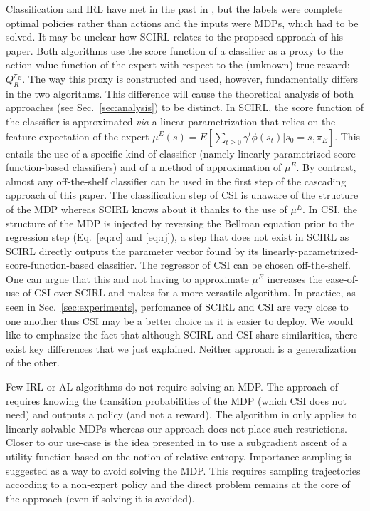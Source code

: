 \documentclass[smallextended]{svjour3}
\begin{document}
Classification and IRL have met in the past in \cite{ratliff2006maximum}, but the labels were complete optimal policies rather than actions and the inputs were MDPs, which had to be solved. It may be unclear how SCIRL \cite{klein2012scirl} relates to the proposed approach of his paper. Both algorithms use the score function of a classifier as a proxy to the action-value function of the expert with respect to the (unknown) true reward: $Q^{\pi_E}_R$. The way this proxy is constructed and used, however, fundamentally differs in the two algorithms. This difference will cause the theoretical analysis of both approaches (see Sec.~\ref{sec:analysis}) to be distinct. In SCIRL, the score function of the classifier is approximated {\it via} a linear parametrization that relies on the feature expectation of the expert $\mu^E(s) = E[\sum_{t\geq 0}\gamma^t\phi(s_t)|s_0=s,\pi_E]$. This entails the use of a specific kind of classifier (namely linearly-parametrized-score-function-based classifiers) and of a method of approximation of $\mu^E$. By contrast, almost any off-the-shelf classifier can be used in the first step of the cascading approach of this paper. The classification step of CSI is unaware of the structure of the MDP whereas SCIRL knows about it thanks to the use of $\mu^E$. In CSI, the structure of the MDP is injected by reversing the Bellman equation prior to the regression step (Eq.~\ref{eq:rc} and \eqref{eq:rj}), a step that does not exist in SCIRL as SCIRL directly outputs the parameter vector found by its linearly-parametrized-score-function-based classifier. The regressor of CSI can be chosen off-the-shelf. One can argue that this and not having to approximate $\mu^E$ increases the ease-of-use of CSI over SCIRL and makes for a more versatile algorithm. In practice, as seen in Sec.~\ref{sec:experiments}, perfomance of SCIRL and CSI are very close to one another thus CSI may be a better choice as it is easier to deploy. We would like to emphasize the fact that although SCIRL and CSI share similarities, there exist key differences that we just explained. Neither approach is a generalization of the other.

Few IRL or AL algorithms do not require solving an MDP. The approach of \cite{syed2008apprenticeship} requires knowing the transition probabilities of the MDP (which CSI does not need) and outputs a policy (and not a reward). The algorithm in \cite{dvijotham2010inverse} only applies to linearly-solvable MDPs whereas our approach does not place such restrictions. Closer to our use-case is the idea presented in \cite{boularias2011relative} to use a subgradient ascent of a utility function based on the notion of relative entropy. Importance sampling is suggested as a way to avoid solving the MDP. This requires sampling trajectories according to a non-expert policy and
the direct problem remains at the core of the approach (even if
solving it is avoided).
\end{document}
